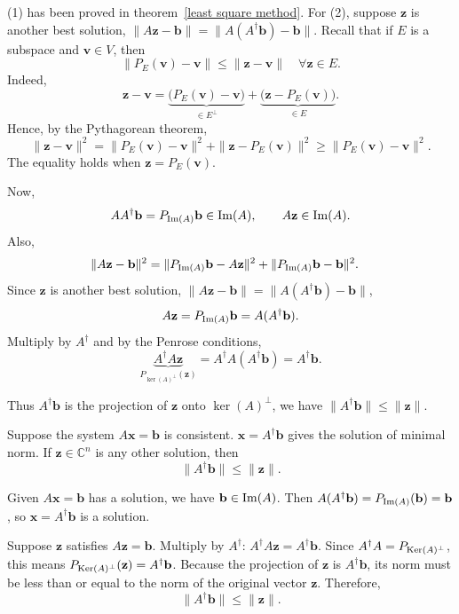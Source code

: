 \begin{pfbox}
(1) has been proved in theorem~\eqref{least square method}.
For (2), suppose $\mathbf{z}$ is another best solution, $\|A\mathbf{z}-\mathbf{b}\|=\|A(A^\dagger\mathbf{b})-\mathbf{b}\|$.
Recall that if $E$ is a subspace and $\mathbf{v}\in V$, then
\[
\|P_E(\mathbf{v})-\mathbf{v}\|
\le
\|\mathbf{z}-\mathbf{v}\| \quad \forall \mathbf{z}\in E.
\]
Indeed,
\[
\mathbf{z}-\mathbf{v}
=
\underbrace{\bigl(P_E(\mathbf{v})-\mathbf{v}\bigr)}_{\in E^\perp}
+
\underbrace{\bigl(\mathbf{z}-P_E(\mathbf{v})\bigr)}_{\in E}.
\]
Hence, by the Pythagorean theorem,
\[
\|\mathbf{z}-\mathbf{v}\|^2
=
\|P_E(\mathbf{v})-\mathbf{v}\|^2
+
\|\mathbf{z}-P_E(\mathbf{v})\|^2
\ge
\|P_E(\mathbf{v})-\mathbf{v}\|^2.
\]
The equality holds when $\mathbf{z}=P_E(\mathbf{v})$.

Now,
\[
AA^\dagger\mathbf{b}
=
P_{\operatorname{Im}(A)}\mathbf{b}
\in \operatorname{Im}(A),
\qquad
A\mathbf{z}\in \operatorname{Im}(A).
\]
Also,
\begin{align*}
\|A\mathbf{z}-\mathbf{b}\|^2
&=
\|P_{\operatorname{Im}(A)}\mathbf{b}-A\mathbf{z}\|^2
+
\|P_{\operatorname{Im}(A)}\mathbf{b}-\mathbf{b}\|^2.
\end{align*}
Since $\mathbf{z}$ is another best solution,
$\|A\mathbf{z}-\mathbf{b}\|=\|A(A^\dagger\mathbf{b})-\mathbf{b}\|$,
\[
A\mathbf{z}=P_{\operatorname{Im}(A)}\mathbf{b}=A(A^\dagger\mathbf{b}).
\]
Multiply by $A^\dagger$ and by the Penrose conditions,
\[
\underbrace{A^\dagger A\mathbf{z}}_{P_{\ker(A)^\perp}(\mathbf{z})}=A^\dagger A(A^\dagger\mathbf{b}) = A^\dagger\mathbf{b}.
\]

Thus $A^\dagger\mathbf{b}$ is the projection of $\mathbf{z}$ onto $\ker(A)^\perp$,
we have $\|A^\dagger\mathbf{b}\|\le\|\mathbf{z}\|$.
\end{pfbox}

\begin{theorem}
Suppose the system $A\mathbf{x}=\mathbf{b}$ is consistent.
$\mathbf{x}=A^\dagger\mathbf{b}$ gives the solution of minimal norm.
If $\mathbf{z}\in \mathbb{C}^n$ is any other solution, then
\[
\|A^\dagger\mathbf{b}\|
\le
\|\mathbf{z}\|.
\]
\end{theorem}

\begin{pfbox}
Given $A\mathbf{x}=\mathbf{b}$ has a solution, we have
$\mathbf{b}\in \operatorname{Im}(A)$.
Then $A(A^\dagger\mathbf{b})=P_{\operatorname{Im}(A)}(\mathbf{b})=\mathbf{b}$,
so $\mathbf{x}=A^\dagger\mathbf{b}$ is a solution.

Suppose $\mathbf{z}$ satisfies $A\mathbf{z}=\mathbf{b}$.
Multiply by $A^\dagger$: $A^\dagger A\mathbf{z}=A^\dagger\mathbf{b}$.
Since $A^\dagger A=P_{\operatorname{Ker}(A)^\perp}$,
this means $P_{\operatorname{Ker}(A)^\perp}(\mathbf{z})=A^\dagger\mathbf{b}$.
Because the projection of $\mathbf{z}$ is $A^\dagger\mathbf{b}$, its norm must be
less than or equal to the norm of the original vector $\mathbf{z}$.
Therefore,
\[
\|A^\dagger\mathbf{b}\|
\le
\|\mathbf{z}\|.
\]
\end{pfbox}

